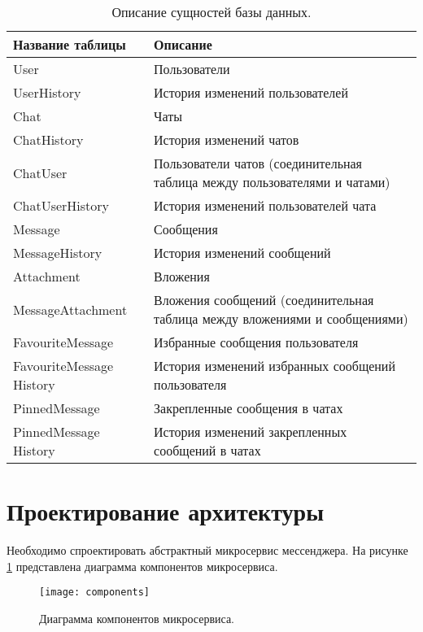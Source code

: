 \begin{table}[H]
\caption{Описание сущностей базы данных. }
\begin{tabular}{|p{4cm}|p{12cm}|}
\hline
Название таблицы&Описание \\ \hline
User & Пользователи \\ \hline
UserHistory & История изменений пользователей \\ \hline
Chat & Чаты \\ \hline
ChatHistory & История изменений чатов \\ \hline
ChatUser & Пользователи чатов (соединительная таблица между пользователями и чатами) \\ \hline
ChatUserHistory & История изменений пользователей чата \\ \hline
Message & Сообщения \\ \hline
MessageHistory & История изменений сообщений \\ \hline
Attachment & Вложения \\ \hline
MessageAttachment & Вложения сообщений (соединительная таблица между вложениями и сообщениями)  \\ \hline
FavouriteMessage & Избранные сообщения пользователя \\ \hline
FavouriteMessage History & История изменений избранных сообщений пользователя \\ \hline
PinnedMessage & Закрепленные сообщения в чатах \\ \hline
PinnedMessage History & История изменений закрепленных сообщений в чатах \\ \hline
\end{tabular}
\label{table:database}
\end{table}

\section{\textbf{Проектирование архитектуры}}

\hfill

Необходимо спроектировать абстрактный микросервис мессенджера. На рисунке \ref{img:components} представлена диаграмма компонентов микросервиса. 

\begin{figure}[H]
	\centering
	\texttt{[image: components]}
	\caption{Диаграмма компонентов микросервиса. }
	\label{img:components}
\end{figure}

